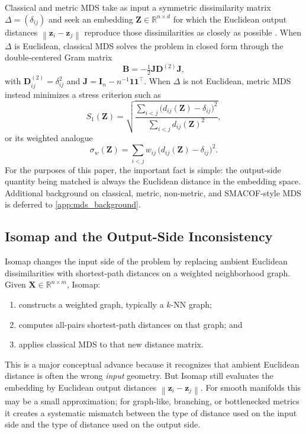\documentclass[twoside,11pt]{article}
\newcommand{\R}{\mathbb{R}}
\newcommand{\bX}{\mathbf{X}}
\newcommand{\bz}{\mathbf{z}}
\newcommand{\bZ}{\mathbf{Z}}
\newcommand{\bD}{\mathbf{D}}
\newcommand{\bB}{\mathbf{B}}
\newcommand{\bI}{\mathbf{I}}
\newcommand{\bJ}{\mathbf{J}}
\newcommand{\norm}[1]{\left\|#1\right\|}
\newcommand{\StressOne}{S_1}
\begin{document}
Classical and metric MDS take as input a symmetric dissimilarity matrix
$\Delta=(\delta_{ij})$ and seek an embedding $\bZ\in\R^{n\times d}$ for which
the Euclidean output distances $\norm{\bz_i-\bz_j}$ reproduce those
dissimilarities as closely as possible
\citep{torgerson1952multidimensional, young1938discussion,
kruskal1964multidimensional, borg2005modern}.  When $\Delta$ is Euclidean,
classical MDS solves the problem in closed form through the double-centered
Gram matrix
\begin{equation}
  \bB = -\tfrac{1}{2} \bJ \bD^{(2)} \bJ,
  \label{eq:gram}
\end{equation}
with $\bD^{(2)}_{ij}=\delta_{ij}^2$ and
$\bJ=\bI_n-n^{-1}\mathbf{1}\mathbf{1}^\top$.  When $\Delta$ is not Euclidean,
metric MDS instead minimizes a stress criterion such as
\begin{equation}
  \StressOne(\bZ) = \sqrt{
    \frac{\displaystyle\sum_{i < j}
          \bigl(d_{ij}(\bZ) - \delta_{ij}\bigr)^2}
         {\displaystyle\sum_{i < j} d_{ij}(\bZ)^2}
  },
  \label{eq:stress1}
\end{equation}
or its weighted analogue
\begin{equation}
  \sigma_w(\bZ)
  = \sum_{i < j} w_{ij}\,\bigl(d_{ij}(\bZ) - \delta_{ij}\bigr)^2.
  \label{eq:weighted_stress}
\end{equation}
For the purposes of this paper, the important fact is simple: the output-side
quantity being matched is always the Euclidean distance in the embedding space.
Additional background on classical, metric, non-metric, and SMACOF-style MDS
is deferred to \cref{app:mds_background}.

\subsection{Isomap and the Output-Side Inconsistency}
\label{sec:isomap}

Isomap \citep{tenenbaum2000global} changes the input side of the problem by
replacing ambient Euclidean dissimilarities with shortest-path distances on a
weighted neighborhood graph.  Given $\bX\in\R^{n\times m}$, Isomap:
\begin{enumerate}
  \item constructs a weighted graph, typically a $k$-NN graph;
  \item computes all-pairs shortest-path distances on that graph; and
  \item applies classical MDS to that new distance matrix.
\end{enumerate}
This is a major conceptual advance because it recognizes that ambient Euclidean
distance is often the wrong \emph{input} geometry.  But Isomap still evaluates
the embedding by Euclidean output distances $\norm{\bz_i-\bz_j}$.  For smooth
manifolds this may be a small approximation; for graph-like, branching, or
bottlenecked metrics it creates a systematic mismatch between the type of
distance used on the input side and the type of distance used on the output
side.
\end{document}
